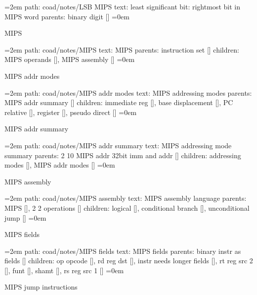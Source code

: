 \par\begingroup
\leftskip=2em
path: coad/notes/LSB MIPS
\smallskip
text:  least significant bit: rightmost bit in MIPS word
\smallskip
parents:  binary digit []
\smallskip
\leftskip=0em
\par\endgroup
\bigskip
{}
MIPS
\smallskip
\par\begingroup
\leftskip=2em
path: coad/notes/MIPS
\smallskip
text:  MIPS
\smallskip
parents:  instruction set []
\smallskip
children: MIPS operands [], MIPS assembly []
\smallskip
\leftskip=0em
\par\endgroup
\bigskip
{}
MIPS addr modes
\smallskip
\par\begingroup
\leftskip=2em
path: coad/notes/MIPS addr modes
\smallskip
text:  MIPS addressing modes
\smallskip
parents:  MIPS addr summary []
\smallskip
children: immediate reg [], base displacement [], PC relative [], register [], pseudo direct []
\smallskip
\leftskip=0em
\par\endgroup
\bigskip
{}
MIPS addr summary
\smallskip
\par\begingroup
\leftskip=2em
path: coad/notes/MIPS addr summary
\smallskip
text:  MIPS addressing mode summary
\smallskip
parents:  2 10 MIPS addr 32bit imm and addr []
\smallskip
children: addressing modes [], MIPS addr modes []
\smallskip
\leftskip=0em
\par\endgroup
\bigskip
{}
MIPS assembly
\smallskip
\par\begingroup
\leftskip=2em
path: coad/notes/MIPS assembly
\smallskip
text:  MIPS assembly language
\smallskip
parents:  MIPS [], 2 2 operations []
\smallskip
children: logical [], conditional branch [], unconditional jump []
\smallskip
\leftskip=0em
\par\endgroup
\bigskip
{}
MIPS fields
\smallskip
\par\begingroup
\leftskip=2em
path: coad/notes/MIPS fields
\smallskip
text:  MIPS fields
\smallskip
parents:  binary instr as fields []
\smallskip
children: op opcode [], rd reg dst [], instr needs longer fields [], rt reg src 2 [], funt [], shamt [], rs reg src 1 []
\smallskip
\leftskip=0em
\par\endgroup
\bigskip
{}
MIPS jump instructions
\smallskip
\par\begingroup
